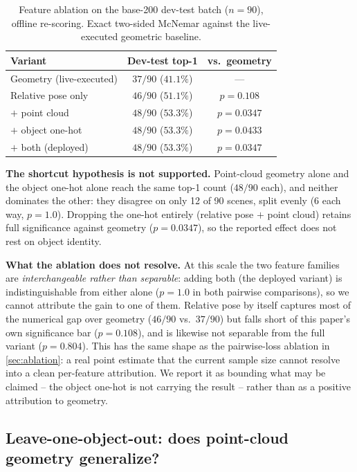\documentclass[journal]{IEEEtran}
\begin{document}
\begin{table}[t]
\centering
\caption{Feature ablation on the base-200 dev-test batch ($n{=}90$),
offline re-scoring. Exact two-sided McNemar against the live-executed
geometric baseline.}
\label{tab:onehot}
\begin{tabular}{lcc}
\toprule
Variant & Dev-test top-1 & vs.\ geometry \\
\midrule
Geometry (live-executed) & $37/90$ ($41.1\%$) & --- \\
Relative pose only       & $46/90$ ($51.1\%$) & $p{=}0.108$ \\
\; $+$ point cloud       & $48/90$ ($53.3\%$) & $p{=}0.0347$ \\
\; $+$ object one-hot    & $48/90$ ($53.3\%$) & $p{=}0.0433$ \\
\; $+$ both (deployed)   & $48/90$ ($53.3\%$) & $p{=}0.0347$ \\
\bottomrule
\end{tabular}
\end{table}

\textbf{The shortcut hypothesis is not supported.} Point-cloud geometry
alone and the object one-hot alone reach the same top-1 count ($48/90$
each), and neither dominates the other: they disagree on only 12 of 90
scenes, split evenly (6 each way, $p{=}1.0$). Dropping the one-hot
entirely (relative pose $+$ point cloud) retains full significance against
geometry ($p{=}0.0347$), so the reported effect does not rest on object
identity.

\textbf{What the ablation does not resolve.} At this scale the two feature
families are \emph{interchangeable rather than separable}: adding both
(the deployed variant) is indistinguishable from either alone ($p{=}1.0$
in both pairwise comparisons), so we cannot attribute the gain to one of
them. Relative pose by itself captures most of the numerical gap over
geometry ($46/90$ vs.\ $37/90$) but falls short of this paper's own
significance bar ($p{=}0.108$), and is likewise not separable from the
full variant ($p{=}0.804$). This has the same shape as the pairwise-loss
ablation in \cref{sec:ablation}: a real point estimate that the current
sample size cannot resolve into a clean per-feature attribution. We report
it as bounding what may be claimed -- the object one-hot is not carrying
the result -- rather than as a positive attribution to geometry.

\subsection{Leave-one-object-out: does point-cloud geometry generalize?}
\label{sec:loo}
\end{document}
